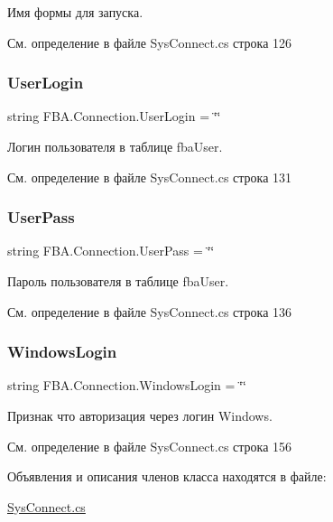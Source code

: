 Имя формы для запуска. ~\newline




См. определение в файле Sys\+Connect.\+cs строка 126

\mbox{\label{class_f_b_a_1_1_connection_a4da6cc26b934f060dc0c3ca79e9791d0}} 
\subsubsection{\texorpdfstring{User\+Login}{UserLogin}}
{\footnotesize\ttfamily string F\+B\+A.\+Connection.\+User\+Login = \char`\"{}\char`\"{}}



Логин пользователя в таблице fba\+User. ~\newline




См. определение в файле Sys\+Connect.\+cs строка 131

\mbox{\label{class_f_b_a_1_1_connection_a9b58e4b1c4ca9af6571431806c0e17a9}} 
\subsubsection{\texorpdfstring{User\+Pass}{UserPass}}
{\footnotesize\ttfamily string F\+B\+A.\+Connection.\+User\+Pass = \char`\"{}\char`\"{}}



Пароль пользователя в таблице fba\+User. ~\newline




См. определение в файле Sys\+Connect.\+cs строка 136

\mbox{\label{class_f_b_a_1_1_connection_a3f41df8459a0eaf38857a233720dd1d0}} 
\subsubsection{\texorpdfstring{Windows\+Login}{WindowsLogin}}
{\footnotesize\ttfamily string F\+B\+A.\+Connection.\+Windows\+Login = \char`\"{}\char`\"{}}



Признак что авторизация через логин Windows. 



См. определение в файле Sys\+Connect.\+cs строка 156



Объявления и описания членов класса находятся в файле\+:\begin{DoxyCompactItemize}
\item 
\mbox{\hyperlink{_sys_connect_8cs}{Sys\+Connect.\+cs}}\end{DoxyCompactItemize}
